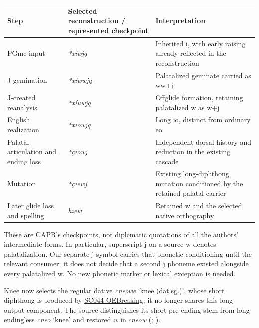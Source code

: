 \documentclass[
  british,
  a4paper,
]{article}
\newcounter{none} %
\begin{document}
{\def\LTcaptype{none} %
\begin{longtable}[]{@{}
  >{\raggedright\arraybackslash}p{}
  >{\raggedright\arraybackslash}p{}
  >{\raggedright\arraybackslash}p{}@{}}
\toprule\noalign{}
\begin{minipage}[b]{\linewidth}\raggedright
Step
\end{minipage} & \begin{minipage}[b]{\linewidth}\raggedright
Selected reconstruction / represented checkpoint
\end{minipage} & \begin{minipage}[b]{\linewidth}\raggedright
Interpretation
\end{minipage} \\
\midrule\noalign{}
\endhead
\bottomrule\noalign{}
\endlastfoot
PGmc input & \emph{*xíwją} & Inherited i, with early raising already
reflected in the reconstruction \\
J-gemination & \emph{*xíwwją} & Palatalized geminate carried as ww+j \\
J-created reanalysis & \emph{*xíuwją} & Offglide formation, retaining
palatalized w as w+j \\
English realization & \emph{*xīowją} & Long īo, distinct from ordinary
ēo \\
Palatal articulation and ending loss & \emph{*çīowj} & Independent
dorsal history and reduction in the existing cascade \\
Mutation & \emph{*çīewj} & Existing long-diphthong mutation conditioned
by the retained palatal carrier \\
Later glide loss and spelling & \emph{hīew} & Retained w and the
selected native orthography \\
\end{longtable}
}

These are CAPR's checkpoints, not diplomatic quotations of all the
authors' intermediate forms. In particular, superscript j on a source w
denotes palatalization. Our separate j symbol carries that phonetic
conditioning until the relevant consumer; it does not decide that a
second j phoneme existed alongside every palatalized w. No new phonetic
marker or lexical exception is needed.

Knee now selects the regular dative \emph{cneowe} `knee (dat.sg.)',
whose short diphthong is produced by \hyperref[rule-OEBreaking]{SC044
OEBreaking}; it no longer shares this long-output component. The source
distinguishes its short pre-ending stem from long endingless \emph{cnēo}
`knee' and restored \emph{w} in \emph{cnēow}
(;
).
\end{document}
